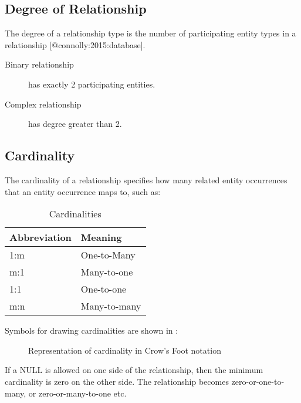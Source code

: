 \subsection{Degree of Relationship}\label{degree-of-relationship}

The degree of a relationship type is the number of participating entity
types in a relationship {[}@connolly:2015:database{]}.

\begin{description}
\item[Binary relationship]
has exactly 2 participating entities.
\item[Complex relationship]
has degree greater than 2.
\end{description}

\subsection{Cardinality}\label{cardinality}

The cardinality of a relationship specifies how many related entity
occurrences that an entity occurrence maps to, such as:

\begin{table}[htbp]
  \centering
  \begin{tabular}{l l}
    \toprule
    \textbf{Abbreviation} & \textbf{Meaning}\\
    \midrule
    1:m & One-to-Many\\
    m:1 & Many-to-one\\
    1:1 & One-to-one\\
    m:n & Many-to-many\\
    \bottomrule
  \end{tabular}
  \caption{Cardinalities}
  \label{tab:cardinalities}
\end{table}

Symbols for drawing cardinalities are shown in :

\begin{figure}[htbp]
\centering
\caption{Representation of cardinality in Crow's Foot notation{}}
\end{figure}

If a NULL is allowed on one side of the relationship, then the minimum
cardinality is zero on the other side. The relationship becomes
zero-or-one-to-many, or zero-or-many-to-one etc.

\begin{figure}[htbp]
\centering
\end{figure}

